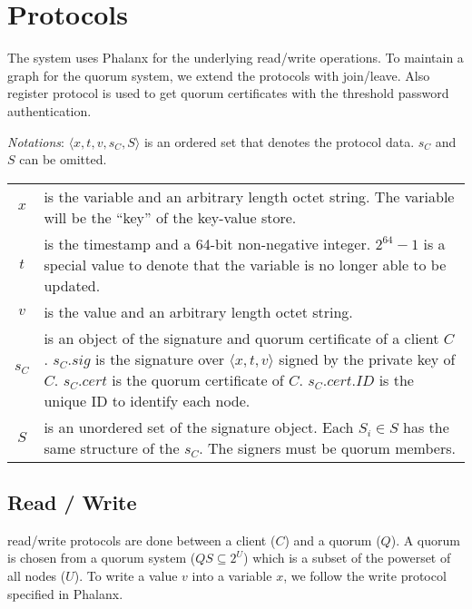 \section{Protocols}
\label{Protocols}
The system uses Phalanx \cite{Delhi:2} for the underlying {\sf
read/write} operations. To maintain a graph for the quorum system, we
extend the protocols with {\sf join/leave}. Also {\sf register}
protocol is used to get quorum certificates with the threshold
password authentication.

{\em Notations}:
$\langle x, t, v, s_C, S \rangle$ is an ordered set that denotes the protocol
data. $s_C$ and $S$ can be omitted.

\begin{tabular}{cl}
  $x$ & \begin{minipage}[t]{0.8\columnwidth}%
    is the variable and an arbitrary length octet
    string. The variable will be the ``key'' of the key-value store.%
  \end{minipage}\\
  $t$ & \begin{minipage}[t]{0.8\columnwidth}%
    is the timestamp and a 64-bit non-negative
    integer. $2^{64}-1$ is a special value to denote that the variable is
    no longer able to be updated.%
  \end{minipage}\\
  $v$ & \begin{minipage}[t]{0.8\columnwidth}%
    is the value and an arbitrary length octet string.%
  \end{minipage}\\
  $s_C$ & \begin{minipage}[t]{0.8\columnwidth}%
    is an object of the signature and quorum certificate
    of a client $C$. $s_C.sig$ is the signature over $\langle x, t, v
    \rangle$ signed by the private key of $C$. $s_C.cert$ is the quorum
    certificate of $C$. $s_C.cert.ID$ is the unique ID to identify each
    node.%
  \end{minipage}\\
  $S$ & \begin{minipage}[t]{0.8\columnwidth}%
    is an unordered set of the signature object. Each $S_i
    \in S$ has the
    same structure of the $s_C$. The signers must be quorum members.%
  \end{minipage}\\
\end{tabular}

\subsection{Read / Write}
\label{rw}
{\sf read/write} protocols are done between a client ($C$) and a
quorum ($Q$). A quorum is chosen from a quorum system ($QS \subseteq
2^U$) which is a subset of the powerset of all nodes ($U$).  To write
a value $v$ into a variable $x$, we follow the write protocol
specified in Phalanx.\\

